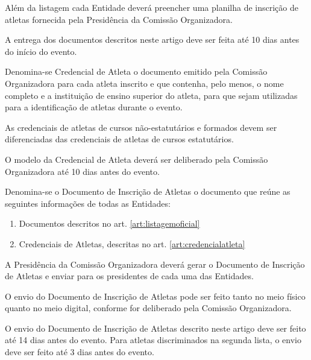 \begin{article}
	\begin{xparagraph}
	    Além da listagem cada Entidade deverá preencher uma planilha de inscrição de atletas fornecida pela Presidência da Comissão Organizadora.
	\end{xparagraph}

	\begin{xparagraph}
	    A entrega dos documentos descritos neste artigo deve ser feita até 10 dias antes do início do evento.
	\end{xparagraph}
\end{article}

\begin{article}
    \label{art:credencialatleta}
    Denomina-se Credencial de Atleta o documento emitido pela Comissão Organizadora para cada atleta inscrito e que contenha, pelo menos, o nome completo e a instituição de ensino superior do atleta, para que sejam utilizadas para a identificação de atletas durante o evento.

	\begin{xparagraph}
	    As credenciais de atletas de cursos não-estatutários e formados devem ser diferenciadas das credenciais de atletas de cursos estatutários.
	\end{xparagraph}

	\begin{xparagraph}
	    O modelo da Credencial de Atleta deverá ser deliberado pela Comissão Organizadora até 10 dias antes do evento.
	\end{xparagraph}
\end{article}

\begin{article}
    Denomina-se o Documento de Inscrição de Atletas o documento que reúne as seguintes informações de todas as Entidades:
	\begin{enumerate}[noitemsep,leftmargin=2\parindent]
		\item Documentos descritos no art. \ref{art:listagemoficial}\ulo
		\item Credenciais de Atletas, descritas no art. \ref{art:credencialatleta}\ulo
	\end{enumerate}
\end{article}

\begin{article}
    \label{art:inscricaoatletas}
    A Presidência da Comissão Organizadora deverá gerar o Documento de Inscrição de Atletas e enviar para os presidentes de cada uma das Entidades.

	\begin{xparagraph}
	    O envio do Documento de Inscrição de Atletas pode ser feito tanto no meio físico quanto no meio digital, conforme for deliberado pela Comissão Organizadora.
	\end{xparagraph}

	\begin{xparagraph}
	    O envio do Documento de Inscrição de Atletas descrito neste artigo deve ser feito até 14 dias antes do evento. Para atletas discriminados na segunda lista, o envio deve ser feito até 3 dias antes do evento.
	\end{xparagraph}
\end{article}

